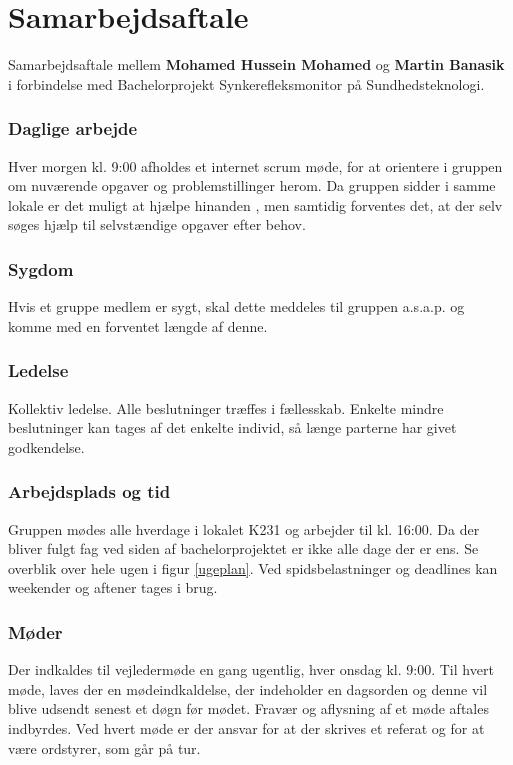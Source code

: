 \documentclass[main.tex]{subfiles}
\begin{document}
\chapter*{Samarbejdsaftale}


Samarbejdsaftale mellem \textbf{Mohamed Hussein Mohamed} og\textbf{ Martin Banasik} i forbindelse med Bachelorprojekt Synkerefleksmonitor på Sundhedsteknologi. 

\subsection*{Daglige arbejde}
Hver morgen kl. 9:00 afholdes et internet scrum møde, for at orientere i gruppen om nuværende opgaver og problemstillinger herom. 
Da gruppen sidder i samme lokale er det muligt at hjælpe hinanden , men samtidig forventes det, at der selv søges hjælp til selvstændige opgaver efter behov. 

\subsection*{Sygdom}
Hvis et gruppe medlem er sygt, skal dette meddeles til gruppen a.s.a.p. og komme med en forventet længde af denne.

\subsection*{Ledelse}
Kollektiv ledelse. 
Alle beslutninger træffes i fællesskab. 
Enkelte mindre beslutninger kan tages af det enkelte individ, så længe parterne har givet godkendelse. 

\subsection*{Arbejdsplads og tid}
Gruppen mødes alle hverdage i lokalet K231 og arbejder til kl. 16:00. Da der bliver fulgt fag ved siden af bachelorprojektet er ikke alle dage der er ens. Se overblik over hele ugen i figur \ref{ugeplan}. Ved spidsbelastninger og deadlines kan weekender og aftener tages i brug.

\subsection*{Møder}
Der indkaldes til vejledermøde en gang ugentlig, hver onsdag kl. 9:00. 
Til hvert møde, laves der en mødeindkaldelse, der indeholder en dagsorden og denne vil blive udsendt senest et døgn før mødet.
Fravær og aflysning af et møde aftales indbyrdes. 
Ved hvert møde er der ansvar for at der skrives et referat og for at være ordstyrer, som går på tur.
\end{document}
